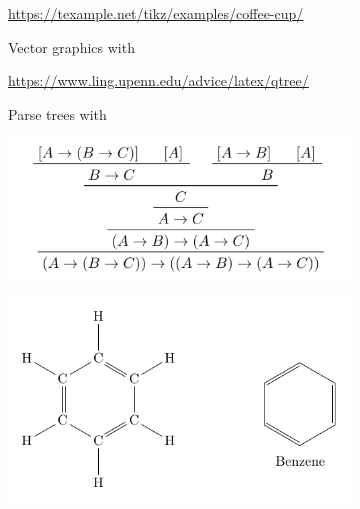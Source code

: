 \begin{figure}[p]
{\begin{subfigure}{\widefigurewidth}
		\end{subfigure}
		\colrules
		\begin{subfigure}[t]{\widefigurewidth}
			\caption{Vector graphics with }
			\centering\tiny{\url{https://texample.net/tikz/examples/coffee-cup/}}
			\label{fig:tikz-example}
		\end{subfigure}
		\hspace{\widefiguregap}
		\begin{subfigure}[t]{\widefigurewidth}
			\caption{Parse trees with }
			\centering\tiny{\url{https://www.ling.upenn.edu/advice/latex/qtree/}}
			\label{fig:qtree-example}
		\end{subfigure}
		\medskip

		\colrules
		\begin{subfigure}{\widefigurewidth}
			\includegraphics[width=\linewidth]{graphics/prftree.png}
		\end{subfigure}
		\hspace{\widefiguregap}
		\begin{subfigure}{\widefigurewidth}
			\includegraphics[width=\linewidth]{graphics/benzene-ring.pdf}

\end{subfigure}}
\end{figure}
